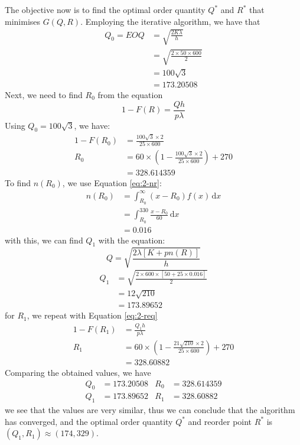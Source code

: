 \documentclass[12pt]{article}
\begin{document}
\noindent The objective now is to find the optimal order quantity $Q^{*}$ and $R^{*}$ that minimises $G(Q,R)$. Employing the iterative algorithm, we have that \begin{align*}
    Q_{0} = EOQ &= \sqrt{ \frac{2K\lambda}{h}} \\ 
    &= \sqrt{ \frac{2\times 50 \times 600}{2}} \\ 
    &= 100\sqrt{3} \\ 
    &= 173.20508
\end{align*} Next, we need to find $R_{0}$ from the equation \begin{equation}\label{eq:2-req}
    1- F(R) = \frac{Qh}{p\lambda} 
\end{equation} Using $Q_{0} = 100\sqrt{3}$, we have: \begin{align*}
    1-F(R_{0}) &= \frac{100\sqrt{3}\times 2}{25 \times 600} \\ 
    R_{0} &= 60 \times \left( 1-\frac{100\sqrt{3}\times 2}{25 \times 600}  \right) + 270 \\ 
    &= 328.614359
\end{align*} To find $n(R_{0})$, we use Equation \ref{eq:2-nr}: \begin{align*}
    n(R_{0}) &= \int_{R_{0}}^{\infty} (x - R_{0})f(x) \, \mathrm{d}x \\ 
    &= \int_{R_{0}}^{330} \frac{x-R_{0}}{60} \, \mathrm{d}x \\ 
    &= 0.016
\end{align*} with this, we can find $Q_{1}$ with the equation: \begin{equation}\label{eq:2-qeq}
    Q = \sqrt{ \frac{2 \lambda [K + pn(R)]}{h}}
\end{equation} \begin{align*}
    Q_{1} &= \sqrt{ \frac{2 \times 600 \times [50 + 25 \times 0.016]}{2}} \\ 
    &= 12\sqrt{210} \\ 
    &= 173.89652
\end{align*} for $R_{1}$, we repeat with Equation \ref{eq:2-req} \begin{align*}
    1 - F(R_{1}) &= \frac{Q_{1}h}{p\lambda} \\ 
    R_{1} &= 60 \times \left( 1- \frac{21\sqrt{210} \times 2}{25 \times 600} \right) + 270 \\ 
    &= 328.60882
\end{align*} Comparing the obtained values, we have \begin{align*}
    Q_{0} &= 173.20508 & R_{0} &= 328.614359 \\ 
    Q_{1} &= 173.89652 & R_{1} &= 328.60882
\end{align*} we see that the values are very similar, thus we can conclude that the algorithm has converged, and the optimal order quantity $Q^{*}$ and reorder point $R^{*}$ is $(Q_{1}, R_{1}) \approx (174, 329)$. 
\end{document}

